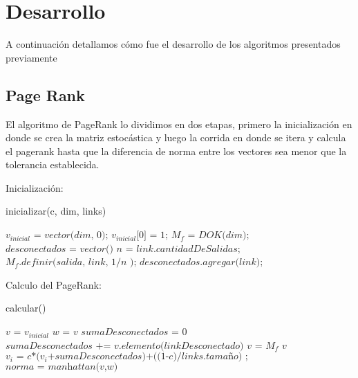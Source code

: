 \section{Desarrollo}

A continuación detallamos cómo fue el desarrollo de los algoritmos presentados previamente

\subsection{Page Rank}
El algoritmo de PageRank lo dividimos en dos etapas, primero la inicializaci\'on en donde se crea la matriz estoc\'astica y luego la corrida en donde se itera y calcula el pagerank hasta que la diferencia de norma entre los vectores sea menor que la tolerancia establecida.


Inicializaci\'on:


\begin{algorithm}
\caption{inicializar(c, dim, links)}\label{euclid}
\begin{algorithmic}[1]
\State $\textit{$v_{inicial}$ = vector(dim, 0);}$ 
\State $\textit{$v_{inicial}$[0] = 1;}$ 
\State $\textit{$M_f$ = DOK(dim);}$ 
\State $\textit{desconectados = vector()}$ 
		\State $\textit{n = link.cantidadDeSalidas;}$
			\State $\textit{$M_f$.definir(salida, link, 1/n );}$ 
		\EndFor
		\Else
			\State $\textit{desconectados.agregar(link);}$ 
	\EndIf
\EndFor


\end{algorithmic}
\end{algorithm}

Calculo del PageRank:


\begin{algorithm}
\caption{calcular()}\label{euclid}
\begin{algorithmic}[1]
\State  $\textit{v = $v_{inicial}$}$
 
	\State $\textit{w = v}$ 
	\State  $\textit{sumaDesconectados = 0}$
		\State $\textit{sumaDesconectados += v.elemento(linkDesconectado)}$ \Comment{}
	\EndFor
	\State $\textit{v = $M_f$ v}$ 
		\State $\textit{$v_i$ = c*($v_i$+sumaDesconectados)+((1-c)/links.tamaño)  ;}$ \Comment{}
	\EndFor
	\State $\textit{norma = manhattan(v,w)}$ 
\EndWhile
\end{algorithmic}
\end{algorithm}
 

